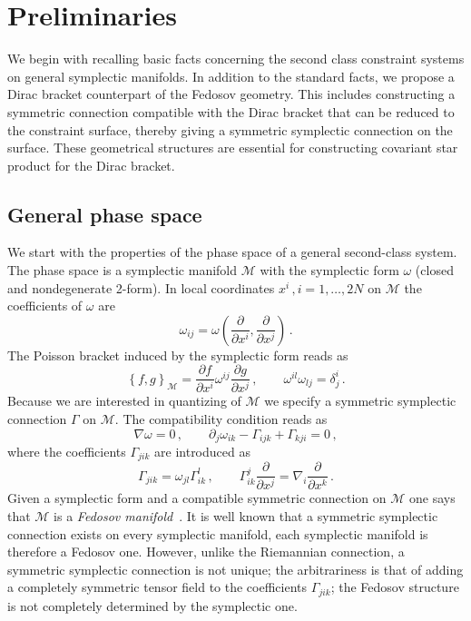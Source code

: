 \documentclass[a4paper,11pt]{amsart}
\numberwithin{thm}{section} %
\numberwithin{equation}{section} %
\numberwithin{figure}{section} %
\newcommand{\pb}[2]{\left\{{}#1{},{}#2{}\right\}}
\renewcommand{\:}{{\rm\, :\,}}
\def\d{\partial}
\newcommand{\dl}[1]{\displaystyle\frac{{\d}}{\d #1}}
\newcommand{\ddl}[2]{\displaystyle\frac{{\d #1}}{\d #2}}
\def\manM{{\mathcal M}}
\begin{document}
\section{Preliminaries}\label{sec:preliminaries}
We begin with recalling basic facts concerning the second 
class constraint systems on general symplectic manifolds. 
In addition to the standard facts, we propose a Dirac bracket
counterpart of the Fedosov geometry.  This includes constructing
a symmetric connection compatible with the Dirac bracket that can be
reduced to the constraint surface, thereby giving a symmetric
symplectic connection on the surface. These geometrical structures are
essential for constructing covariant star product for the Dirac
bracket.

\subsection{General phase space}
We start with the properties of the phase space of a general
second-class system.  The phase space is a
symplectic manifold $\manM$ with the symplectic form $\omega$
(closed and nondegenerate 2-form).  In local coordinates
$x^i\,,i=1,\ldots,2N$
on $\manM$ the coefficients of $\omega$ are
\begin{equation}
\label{aaa}
  \omega_{ij}=\omega({\frac{\d}{\d x^i},\frac{\d}{\d x^j}})\,.
\end{equation}
The Poisson bracket induced by the symplectic form reads as
\begin{equation}
  \pb{f}{g}_\manM=\ddl{f}{x^i}\omega^{ij}\ddl{g}{x^j}\,, \qquad
  \omega^{il}\omega_{lj}=\delta^{i}_{j}\,.
\end{equation}
Because we are interested in quantizing of $\manM$ we specify a
symmetric symplectic connection $\Gamma$ on $\manM$. The
compatibility condition reads as
\begin{equation}
  \nabla \omega =0 \,, \qquad \d_j\omega_{ik}-\Gamma_{ijk}+\Gamma_{kji}=0\,,
\end{equation}
where the coefficients $\Gamma_{jik}$ are introduced as
\begin{equation}
  \Gamma_{jik}=\omega_{jl} \Gamma^l_{ik}\,, \qquad
  \Gamma^j_{ik}\dl{x^j}=\nabla_{i}\dl{x^k}\,.
\end{equation}
Given a symplectic form and a compatible symmetric connection on
$\manM$ one says that $\manM$ is a \textit{Fedosov
  manifold}~\cite{[GRS]}.  It is well known that a symmetric symplectic
connection exists on every symplectic manifold, each
symplectic manifold is therefore a Fedosov one. However,
unlike the Riemannian connection, a symmetric symplectic connection is
not unique; the arbitrariness is that of adding a completely symmetric
tensor field to the coefficients $\Gamma_{jik}$; the Fedosov structure
is not completely determined by the symplectic one.
\end{document}
